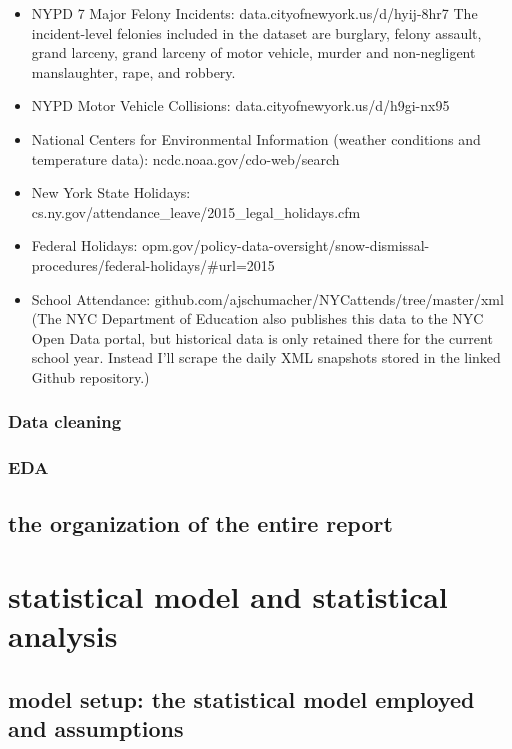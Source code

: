 \documentclass[12pt,notitlepage]{article}
\begin{document}
\begin{itemize}
\item NYPD 7 Major Felony Incidents: data.cityofnewyork.us/d/hyij-8hr7
The incident-level felonies included in the dataset are burglary, felony assault, grand larceny, grand larceny of motor vehicle, murder and non-negligent manslaughter, rape, and robbery.

\item NYPD Motor Vehicle Collisions: data.cityofnewyork.us/d/h9gi-nx95
\item National Centers for Environmental Information (weather conditions and temperature data): ncdc.noaa.gov/cdo-web/search
\item New York State Holidays: cs.ny.gov/attendance\_leave/2015\_legal\_holidays.cfm
\item Federal Holidays: opm.gov/policy-data-oversight/snow-dismissal-procedures/federal-holidays/\#url=2015
\item School Attendance: github.com/ajschumacher/NYCattends/tree/master/xml
(The NYC Department of Education also publishes this data to the NYC Open Data portal, but historical data is only retained there for the current school year. Instead I’ll scrape the daily XML snapshots stored in the linked Github repository.)
\end{itemize}

\subsubsection{Data cleaning}


\subsubsection{EDA}


\subsection{the organization of the entire report}






\section{statistical model and statistical analysis}


\subsection{model setup: the statistical model employed and assumptions}
\end{document}
